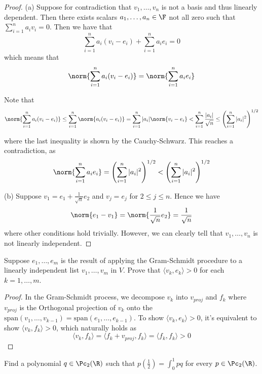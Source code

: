 \documentclass{extarticle}
\begin{document}
\begin{proof}
(a) Suppose for contradiction that \(v_1, \ldots, v_n\) is not a basis and thus linearly dependent.
Then there exists scalars \(a_1, \ldots, a_n \in \F\) not all zero such that \(\sum_{i=1}^{n}a_iv_i = 0\).
Then we have that
\[\sum_{i=1}^{n} a_i (v_i - e_i) +  \sum_{i=1}^{n} a_i e_i = 0\]
which means that
\[\norm{\sum_{i=1}^{n} a_i (v_i - e_i)} = \norm{\sum_{i=1}^{n} a_i e_i}\]

Note that
\[\norm{\sum_{i=1}^{n} a_i (v_i - e_i)} \leq \sum_{i=1}^{n} \norm{a_i (v_i - e_i)}
= \sum_{i=1}^{n} |a_i| \norm{v_i - e_i} < \sum_{i=1}^{n} \frac{|a_i|}{\sqrt{n}} \leq \left(\sum_{i=1}^{n} |a_i|^2\right)^{1/2}\]

where the last inequality is shown by the Cauchy-Schwarz. This reaches a contradiction, as
\[\norm{\sum_{i=1}^{n} a_i e_i} = \left(\sum_{i=1}^{n} |a_i|^2 \right)^{1/2} < \left(\sum_{i=1}^{n} |a_i|^2 \right)^{1/2}\]

(b) Suppose \(v_1 = e_1 + \frac{1}{\sqrt{n}}e_2\) and \(v_j = e_j\) for \(2 \leq j \leq n\). Hence we have
\[\norm{e_1 - v_1} = \norm{\frac{1}{\sqrt{n}} e_2} = \frac{1}{\sqrt{n}}\]
where other conditions hold trivially. However, we can clearly tell that \(v_1, \ldots, v_n\) is not
linearly independent.
\end{proof}

\begin{problem}{9}
    Suppose \(e_1, \ldots, e_m\) is the result of applying the Gram-Schmidt procedure to a linearly
    independent list \(v_1, \ldots, v_m\) in \(V\). Prove that \(\langle v_k,e_k \rangle > 0\) for
    each \(k = 1, \ldots, m\).
\end{problem}

\begin{proof}
In the Gram-Schmidt process, we decompose \(v_k\) into \(v_{proj}\) and \(f_k\) where \(v_{proj}\) is
the Orthogonal projection of \(v_k\) onto the \(\text{span}(v_1, \ldots, v_{k-1}) = \text{span}(e_1, \ldots, e_{k-1})\).
To show \(\langle v_k,e_k \rangle > 0\), it's equivalent to show \(\langle v_k, f_k \rangle > 0\), which
naturally holds as
\[\langle v_k,f_k \rangle = \langle f_k + v_{proj},f_k \rangle = \langle f_k,f_k \rangle > 0\]
\end{proof}

\begin{problem}{11}
    Find a polynomial \(q \in \Pc_2(\R)\) such that \(p(\frac{1}{2}) = \int_{0}^{1}pq \) for every
    \(p \in \Pc_2(\R)\).
\end{problem}
\end{document}
